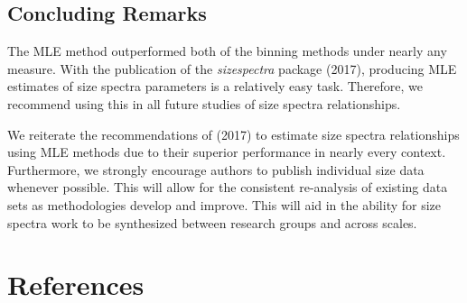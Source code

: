 \documentclass[
]{article}
\begin{document}
\hypertarget{concluding-remarks}{%
\subsection{Concluding Remarks}\label{concluding-remarks}}

The MLE method outperformed both of the binning methods under nearly any
measure. With the publication of the \emph{sizespectra} package (2017),
producing MLE estimates of size spectra parameters is a relatively easy
task. Therefore, we recommend using this in all future studies of size
spectra relationships.

We reiterate the recommendations of (2017) to estimate size spectra
relationships using MLE methods due to their superior performance in
nearly every context. Furthermore, we strongly encourage authors to
publish individual size data whenever possible. This will allow for the
consistent re-analysis of existing data sets as methodologies develop
and improve. This will aid in the ability for size spectra work to be
synthesized between research groups and across scales.

\newpage

\hypertarget{references}{%
\section{References}\label{references}}
\end{document}
